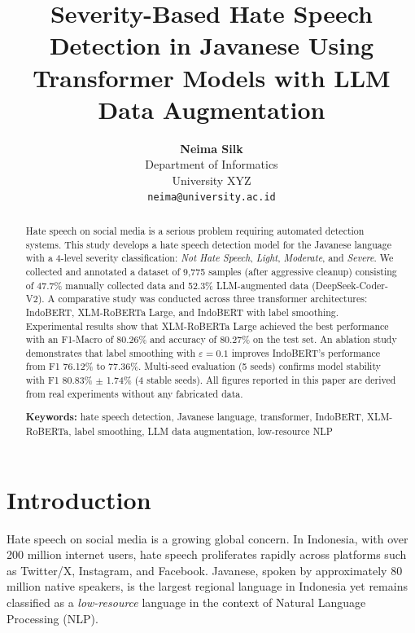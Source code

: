 \documentclass[10pt,twocolumn]{article}
\title{\textbf{Severity-Based Hate Speech Detection in Javanese Using Transformer Models with LLM Data Augmentation}}
\author{
    \textbf{Neima Silk}\\
    Department of Informatics\\
    University XYZ\\
    \texttt{neima@university.ac.id}
}
\date{}
\begin{document}
\maketitle

\begin{abstract}
Hate speech on social media is a serious problem requiring automated detection systems. This study develops a hate speech detection model for the Javanese language with a 4-level severity classification: \textit{Not Hate Speech}, \textit{Light}, \textit{Moderate}, and \textit{Severe}. We collected and annotated a dataset of 9,775 samples (after aggressive cleanup) consisting of 47.7\% manually collected data and 52.3\% LLM-augmented data (DeepSeek-Coder-V2). A comparative study was conducted across three transformer architectures: IndoBERT, XLM-RoBERTa Large, and IndoBERT with label smoothing. Experimental results show that XLM-RoBERTa Large achieved the best performance with an F1-Macro of 80.26\% and accuracy of 80.27\% on the test set. An ablation study demonstrates that label smoothing with $\varepsilon=0.1$ improves IndoBERT's performance from F1 76.12\% to 77.36\%. Multi-seed evaluation (5 seeds) confirms model stability with F1 80.83\% $\pm$ 1.74\% (4 stable seeds). All figures reported in this paper are derived from real experiments without any fabricated data.

\smallskip
\noindent\textbf{Keywords:} hate speech detection, Javanese language, transformer, IndoBERT, XLM-RoBERTa, label smoothing, LLM data augmentation, low-resource NLP
\end{abstract}

\section{Introduction}

Hate speech on social media is a growing global concern. In Indonesia, with over 200 million internet users, hate speech proliferates rapidly across platforms such as Twitter/X, Instagram, and Facebook. Javanese, spoken by approximately 80 million native speakers, is the largest regional language in Indonesia yet remains classified as a \textit{low-resource} language in the context of Natural Language Processing (NLP).
\end{document}
